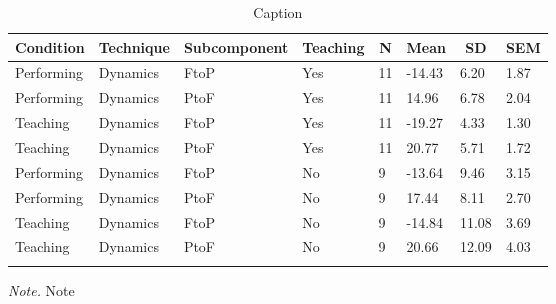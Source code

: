 \documentclass[
  man,floatsintext]{apa6}
\begin{document}
\begin{table}[tbp]

\begin{center}
\begin{threeparttable}

\caption{\label{tab:dyn-diff-teaching-desc-2}Caption}

\begin{tabular}{llllllll}
\toprule
Condition & \multicolumn{1}{c}{Technique} & \multicolumn{1}{c}{Subcomponent} & \multicolumn{1}{c}{Teaching} & \multicolumn{1}{c}{N} & \multicolumn{1}{c}{Mean} & \multicolumn{1}{c}{SD} & \multicolumn{1}{c}{SEM}\\
\midrule
Performing & Dynamics & FtoP & Yes & 11 & -14.43 & 6.20 & 1.87\\
Performing & Dynamics & PtoF & Yes & 11 & 14.96 & 6.78 & 2.04\\
Teaching & Dynamics & FtoP & Yes & 11 & -19.27 & 4.33 & 1.30\\
Teaching & Dynamics & PtoF & Yes & 11 & 20.77 & 5.71 & 1.72\\
Performing & Dynamics & FtoP & No & 9 & -13.64 & 9.46 & 3.15\\
Performing & Dynamics & PtoF & No & 9 & 17.44 & 8.11 & 2.70\\
Teaching & Dynamics & FtoP & No & 9 & -14.84 & 11.08 & 3.69\\
Teaching & Dynamics & PtoF & No & 9 & 20.66 & 12.09 & 4.03\\
\bottomrule
\addlinespace
\end{tabular}

\begin{tablenotes}[para]
\normalsize{\textit{Note.} Note}
\end{tablenotes}

\end{threeparttable}
\end{center}

\end{table}
\end{document}
